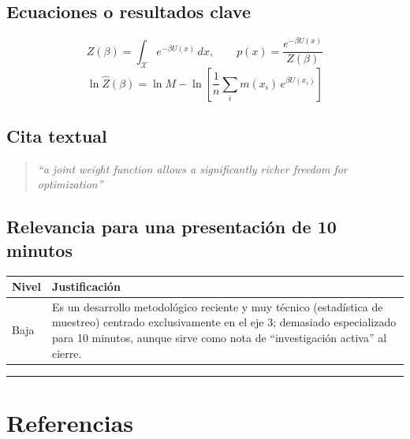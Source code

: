\documentclass[12pt]{article}
\begin{document}
\subsection*{Ecuaciones o resultados clave}
\begin{equation}
Z(\beta) = \int_{\mathcal X} e^{-\beta U(x)}\,dx, \qquad p(x) = \frac{e^{-\beta U(x)}}{Z(\beta)}
\end{equation}
\begin{equation}
\ln \hat Z(\beta) = \ln M - \ln\left[\frac{1}{n}\sum_i m(x_i)\,e^{\beta U(x_i)}\right]
\end{equation}

\subsection*{Cita textual}
\begin{quote}
\textit{``a joint weight function allows a significantly richer freedom for optimization''}
\end{quote}

\subsection*{Relevancia para una presentación de 10 minutos}
\begin{tabular}{@{}p{2cm}p{11.5cm}@{}}
\toprule
\textbf{Nivel} & \textbf{Justificación} \\
\midrule
Baja & Es un desarrollo metodológico reciente y muy técnico (estadística de muestreo) centrado exclusivamente en el eje 3; demasiado especializado para 10 minutos, aunque sirve como nota de ``investigación activa'' al cierre. \\
\bottomrule
\end{tabular}

\bigskip
\hrule
\bigskip

\section*{Referencias}
\end{document}

